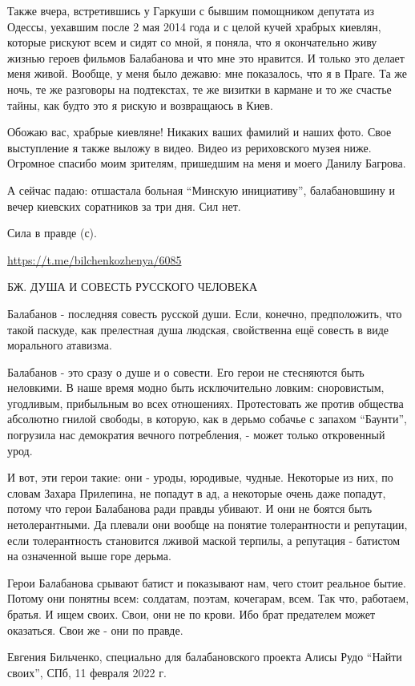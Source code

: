 Также вчера, встретившись у Гаркуши с бывшим помощником депутата из Одессы,
уехавшим после 2 мая 2014 года и с целой кучей храбрых киевлян, которые рискуют
всем и сидят со мной, я поняла, что я окончательно живу жизнью героев фильмов
Балабанова и что мне это нравится. И только это делает меня живой. Вообще, у
меня было дежавю: мне показалось, что я в Праге. Та же ночь, те же разговоры на
подтекстах, те же визитки в кармане и то же счастье тайны, как будто это я
рискую и возвращаюсь в Киев.

Обожаю вас, храбрые киевляне! Никаких ваших фамилий и наших фото. Свое
выступление я также выложу в видео. Видео из рериховского музея ниже. Огромное
спасибо моим зрителям, пришедшим на меня и моего Данилу Багрова.

А сейчас падаю: отшастала больная \enquote{Минскую инициативу}, балабановшину и вечер
киевских соратников за три дня. Сил нет.

Сила в правде (с).

\url{https://t.me/bilchenkozhenya/6085}

БЖ. ДУША И СОВЕСТЬ РУССКОГО ЧЕЛОВЕКА

Балабанов - последняя совесть русской души. Если, конечно, предположить, что
такой паскуде, как прелестная душа людская, свойственна ещё совесть в виде
морального атавизма. 

Балабанов - это сразу о душе и о совести. Его герои не стесняются быть
неловкими. В наше время модно быть исключительно ловким: сноровистым,
угодливым, прибыльным во всех отношениях. Протестовать же против общества
абсолютно гнилой свободы, в которую, как в дерьмо собачье с запахом \enquote{Баунти},
погрузила нас демократия вечного потребления, - может только откровенный урод. 

И вот, эти герои такие: они - уроды, юродивые, чудные. Некоторые из них, по
словам Захара Прилепина, не попадут в ад, а некоторые очень даже попадут,
потому что герои Балабанова ради правды убивают. И они не боятся быть
нетолерантными. Да плевали они вообще на понятие толерантности и репутации,
если толерантность становится лживой маской терпилы, а репутация - батистом на
означенной выше горе дерьма.

Герои Балабанова срывают батист и показывают нам, чего стоит реальное бытие.
Потому они понятны всем: солдатам, поэтам, кочегарам, всем. Так что, работаем,
братья. И ищем своих. Свои, они не по крови. Ибо брат предателем может
оказаться. Свои же - они по правде.

Евгения Бильченко, специально для балабановского проекта Алисы Рудо \enquote{Найти
своих}, СПб, 11 февраля 2022 г.
